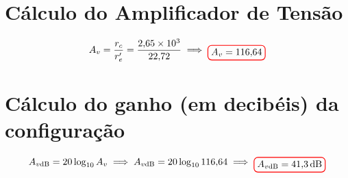 \documentclass[12pt,openany,oneside,a4paper]{abntex2}
\begin{document}
\section{Cálculo do Amplificador de Tensão}
\[
A_v = \frac{r_c}{r_e'} = \frac{2{,}65 \times 10^3}{22{,}72} \implies \tikz[baseline]{\node[draw=red, thick, rounded corners] {$A_v = 116{,}64$};}
\]

\section{Cálculo do ganho (em decibéis) da configuração}
\[
A_{v\text{dB}} = 20 \log_{10} A_v \implies A_{v\text{dB}} = 20 \log_{10} 116{,}64 \implies \tikz[baseline]{\node[draw=red, thick, rounded corners] {$A_{v\text{dB}} = 41{,}3 \, \text{dB}$};}
\]
\end{document}
